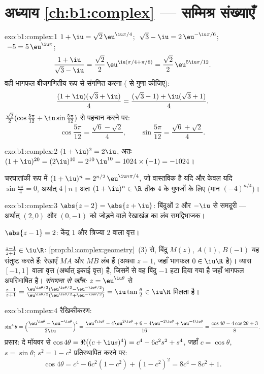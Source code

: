 \section*{अध्याय \ref{ch:b1:complex} --- सम्मिश्र संख्याएँ}

\begin{solution}{exo:b1:complex:1}
$1 + \iu = \sqrt 2\, \eu^{\iu\pi/4}$;
$\;\sqrt 3 - \iu = 2\, \eu^{-\iu\pi/6}$;
$\;-5 = 5\, \eu^{\iu\pi}$;
\[
\frac{1 + \iu}{\sqrt 3 - \iu}
= \frac{\sqrt 2}{2}\, \eu^{\iu(\pi/4 + \pi/6)}
= \frac{\sqrt 2}{2}\, \eu^{5\iu\pi/12}.
\]
वही भागफल बीजगणितीय रूप से संगणित करना ( से गुणा कीजिए):
\[
\frac{(1 + \iu)(\sqrt 3 + \iu)}{4}
= \frac{(\sqrt 3 - 1) + \iu(\sqrt 3 + 1)}{4}.
\]
$\frac{\sqrt 2}{2}(\cos\frac{5\pi}{12} + \iu\sin\frac{5\pi}{12})$ से पहचान
करने पर:
\[
\cos\frac{5\pi}{12} = \frac{\sqrt 6 - \sqrt 2}{4},
\qquad
\sin\frac{5\pi}{12} = \frac{\sqrt 6 + \sqrt 2}{4}.
\]
\end{solution}

\begin{solution}{exo:b1:complex:2}
$(1+\iu)^2 = 2\iu$, अतः $(1+\iu)^{20} = (2\iu)^{10} = 2^{10}\,\iu^{10} =
1024 \times (-1) = -1024$।

चरघातांकी रूप में $(1+\iu)^n = 2^{n/2}\, \eu^{\iu n\pi/4}$, जो वास्तविक है
यदि और केवल यदि $\sin\frac{n\pi}{4} = 0$, अर्थात् $4 \mid n$। अतः $(1+\iu)^n
\in \R$ ठीक $4$ के गुणजों के लिए (मान $(-4)^{n/4}$)।
\end{solution}

\begin{solution}{exo:b1:complex:3}
$\abs{z - 2} = \abs{z + \iu}$: बिंदुओं $2$ और $-\iu$ से समदूरी --- अर्थात्
$(2, 0)$ और $(0, -1)$ को जोड़ने वाले रेखाखंड का लंब समद्विभाजक।

$\abs{z - 1} = 2$: केंद्र $1$ और त्रिज्या $2$ वाला वृत्त।

$\frac{z-1}{z+1} \in \iu\R$: \cref{prop:b1:complex:geometry}~(3) से, बिंदु
$M(z)$, $A(1)$, $B(-1)$ यह संतुष्ट करते हैं: रेखाएँ $MA$ और $MB$ लंब हैं
(अथवा $z = 1$, जहाँ भागफल $0 \in \iu\R$ है)।  व्यास $[-1, 1]$ वाला
वृत्त (अर्थात् इकाई वृत्त) है, जिसमें से वह बिंदु $-1$ हटा दिया गया है जहाँ
भागफल अपरिभाषित है। \emph{संगणना से जाँच:} $z = \eu^{\iu\theta}$ से
$\frac{z-1}{z+1} = \frac{\eu^{\iu\theta/2}(\eu^{\iu\theta/2} -
\eu^{-\iu\theta/2})}{\eu^{\iu\theta/2}(\eu^{\iu\theta/2} +
\eu^{-\iu\theta/2})} = \iu\tan\frac\theta2 \in \iu\R$ मिलता है।
\end{solution}

\begin{solution}{exo:b1:complex:4}
रैखिकीकरण:
\[
\sin^4\theta
= \Bigl(\frac{\eu^{\iu\theta} - \eu^{-\iu\theta}}{2\iu}\Bigr)^{\!4}
= \frac{\eu^{4\iu\theta} - 4\eu^{2\iu\theta} + 6 - 4\eu^{-2\iu\theta}
+ \eu^{-4\iu\theta}}{16}
= \frac{\cos 4\theta - 4\cos 2\theta + 3}{8}.
\]
प्रसार: दे मॉयवर से $\cos 4\theta = \Re\bigl((c + \iu s)^4\bigr) = c^4 -
6c^2 s^2 + s^4$, जहाँ $c = \cos\theta$, $s = \sin\theta$; $s^2 = 1 - c^2$
प्रतिस्थापित करने पर:
\[
\cos 4\theta = c^4 - 6c^2(1 - c^2) + (1 - c^2)^2
= 8c^4 - 8c^2 + 1 .
\]
\end{solution}

